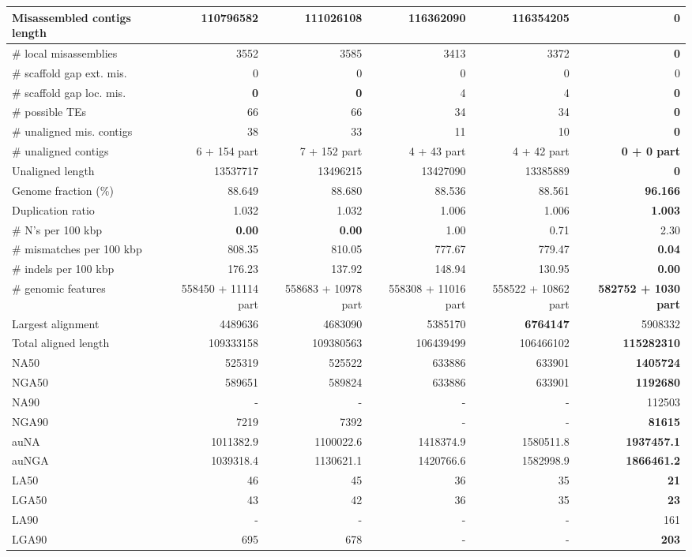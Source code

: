 \documentclass[12pt,a4paper]{article}
\begin{document}
\begin{table}[ht]
\begin{center}
\begin{tabular}{|l*{5}{|r}|}
Misassembled contigs length & 110796582 & 111026108 & 116362090 & 116354205 & {\bf 0} \\ \hline
\# local misassemblies & 3552 & 3585 & 3413 & 3372 & {\bf 0} \\ \hline
\# scaffold gap ext. mis. & 0 & 0 & 0 & 0 & 0 \\ \hline
\# scaffold gap loc. mis. & {\bf 0} & {\bf 0} & 4 & 4 & {\bf 0} \\ \hline
\# possible TEs & 66 & 66 & 34 & 34 & {\bf 0} \\ \hline
\# unaligned mis. contigs & 38 & 33 & 11 & 10 & {\bf 0} \\ \hline
\# unaligned contigs & 6 + 154 part & 7 + 152 part & 4 + 43 part & 4 + 42 part & {\bf 0 + 0 part} \\ \hline
Unaligned length & 13537717 & 13496215 & 13427090 & 13385889 & {\bf 0} \\ \hline
Genome fraction (\%) & 88.649 & 88.680 & 88.536 & 88.561 & {\bf 96.166} \\ \hline
Duplication ratio & 1.032 & 1.032 & 1.006 & 1.006 & {\bf 1.003} \\ \hline
\# N's per 100 kbp & {\bf 0.00} & {\bf 0.00} & 1.00 & 0.71 & 2.30 \\ \hline
\# mismatches per 100 kbp & 808.35 & 810.05 & 777.67 & 779.47 & {\bf 0.04} \\ \hline
\# indels per 100 kbp & 176.23 & 137.92 & 148.94 & 130.95 & {\bf 0.00} \\ \hline
\# genomic features & 558450 + 11114 part & 558683 + 10978 part & 558308 + 11016 part & 558522 + 10862 part & {\bf 582752 + 1030 part} \\ \hline
Largest alignment & 4489636 & 4683090 & 5385170 & {\bf 6764147} & 5908332 \\ \hline
Total aligned length & 109333158 & 109380563 & 106439499 & 106466102 & {\bf 115282310} \\ \hline
NA50 & 525319 & 525522 & 633886 & 633901 & {\bf 1405724} \\ \hline
NGA50 & 589651 & 589824 & 633886 & 633901 & {\bf 1192680} \\ \hline
NA90 & - & - & - & - & 112503 \\ \hline
NGA90 & 7219 & 7392 & - & - & {\bf 81615} \\ \hline
auNA & 1011382.9 & 1100022.6 & 1418374.9 & 1580511.8 & {\bf 1937457.1} \\ \hline
auNGA & 1039318.4 & 1130621.1 & 1420766.6 & 1582998.9 & {\bf 1866461.2} \\ \hline
LA50 & 46 & 45 & 36 & 35 & {\bf 21} \\ \hline
LGA50 & 43 & 42 & 36 & 35 & {\bf 23} \\ \hline
LA90 & - & - & - & - & 161 \\ \hline
LGA90 & 695 & 678 & - & - & {\bf 203} \\ \hline
\end{tabular}
\end{center}
\end{table}
\end{document}
